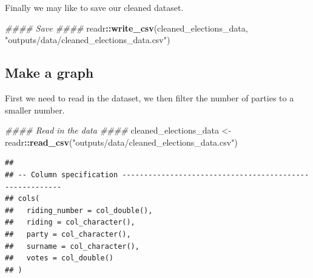 \documentclass[
]{book}
\newenvironment{Shaded}{\begin{snugshade}}{\end{snugshade}}
\newcommand{\CommentTok}[1]{\textcolor[rgb]{0.56,0.35,0.01}{\textit{#1}}}
\newcommand{\KeywordTok}[1]{\textcolor[rgb]{0.13,0.29,0.53}{\textbf{#1}}}
\newcommand{\NormalTok}[1]{#1}
\newcommand{\OperatorTok}[1]{\textcolor[rgb]{0.81,0.36,0.00}{\textbf{#1}}}
\newcommand{\StringTok}[1]{\textcolor[rgb]{0.31,0.60,0.02}{#1}}
\begin{document}
Finally we may like to save our cleaned dataset.

\begin{Shaded}
\begin{Highlighting}[]
\CommentTok{#### Save ####}
\NormalTok{readr}\OperatorTok{::}\KeywordTok{write_csv}\NormalTok{(cleaned_elections_data, }\StringTok{"outputs/data/cleaned_elections_data.csv"}\NormalTok{)}
\end{Highlighting}
\end{Shaded}

\hypertarget{make-a-graph}{%
\subsection{Make a graph}\label{make-a-graph}}

First we need to read in the dataset, we then filter the number of parties to a smaller number.

\begin{Shaded}
\begin{Highlighting}[]
\CommentTok{#### Read in the data ####}
\NormalTok{cleaned_elections_data <-}\StringTok{ }
\StringTok{  }\NormalTok{readr}\OperatorTok{::}\KeywordTok{read_csv}\NormalTok{(}\StringTok{"outputs/data/cleaned_elections_data.csv"}\NormalTok{)}
\end{Highlighting}
\end{Shaded}

\begin{verbatim}
## 
## -- Column specification --------------------------------------------------------
## cols(
##   riding_number = col_double(),
##   riding = col_character(),
##   party = col_character(),
##   surname = col_character(),
##   votes = col_double()
## )
\end{verbatim}
\end{document}
